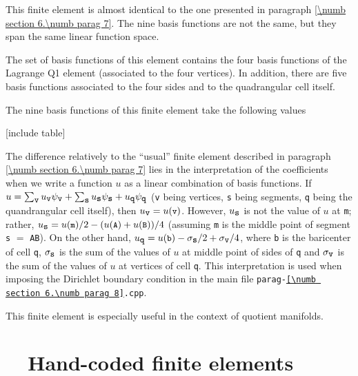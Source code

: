 This finite element is almost identical to the one presented in paragraph
\ref{\numb section 6.\numb parag 7}.
The nine basis functions are not the same, but they span the same linear function space.

The set of basis functions of this element contains the four basis functions of the
Lagrange Q1 element (associated to the four vertices).
In addition, there are five basis functions associated to the four sides and to the
quadrangular cell itself.

The nine basis functions of this finite element take the following values

[include table]

The difference relatively to the ``usual'' finite element described in paragraph
\ref{\numb section 6.\numb parag 7} lies in the interpretation
of the coefficients when we write a function $u$ as a linear combination of basis functions.
If $ u = \sum_{\mbox{\small\tt v}} u_{\mbox{\small\tt v}} \psi_{\mbox{\small\tt v}} +
\sum_{\mbox{\small\tt s}} u_{\mbox{\small\tt s}} \psi_{\mbox{\small\tt s}} +
u_{\mbox{\small\tt q}} \psi_{\mbox{\small\tt q}} $
({\small\tt v} being vertices, {\small\tt s} being segments, {\small\tt q} being the quandrangular
cell itself), then $ u_{\mbox{\small\tt v}} = u(\mbox{\small\tt v}) $.
However, $ u_{\mbox{\small\tt s}} $ is not the value of $u$ at {\small\tt m};
rather, $ u_{\mbox{\small\tt s}} = u(\mbox{\small\tt m}) / 2 - ( u(\mbox{\small\tt A}) +
u(\mbox{\small\tt B}) ) / 4 $ (assuming {\small\tt m} is the middle point of segment
{\small\tt s} $=$ {\small\tt AB}).
On the other hand, $ u_{\mbox{\small\tt q}} = u(\mbox{\small\tt b}) -
\sigma_{\mbox{\small\tt s}}/2 + \sigma_{\mbox{\small\tt v}}/4 $,
where {\small\tt b} is the baricenter of cell {\small\tt q},
$ \sigma_{\mbox{\small\tt s}} $ is the sum of the values of $u$ at middle point of sides of
{\small\tt q} and $ \sigma_{\mbox{\small\tt v}} $ is the sum of the values of $u$ at vertices
of cell {\small\tt q}.
This interpretation is used when imposing the Dirichlet boundary condition in the main file
{\small\tt parag-\ref{\numb section 6.\numb parag 8}.cpp}.

This finite element is especially useful in the context of quotient manifolds.


\section{~~Hand-coded finite elements}\label{\numb section 6.\numb parag 9}

